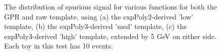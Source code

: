 \begin{figure} 
\begin{center}

\caption{The distribution of spurious signal for various functions for both the GPR and raw template, using (a) the expPoly2-derived 'low' template, (b) the expPoly3-derived 'med' template, (c) the expPoly3-derived 'high' template, extended by 5 GeV on either side. Each toy in this test has 10 events.}
\label{fig:padded_lowpt_10_noSig}
\end{center}
\end{figure}

